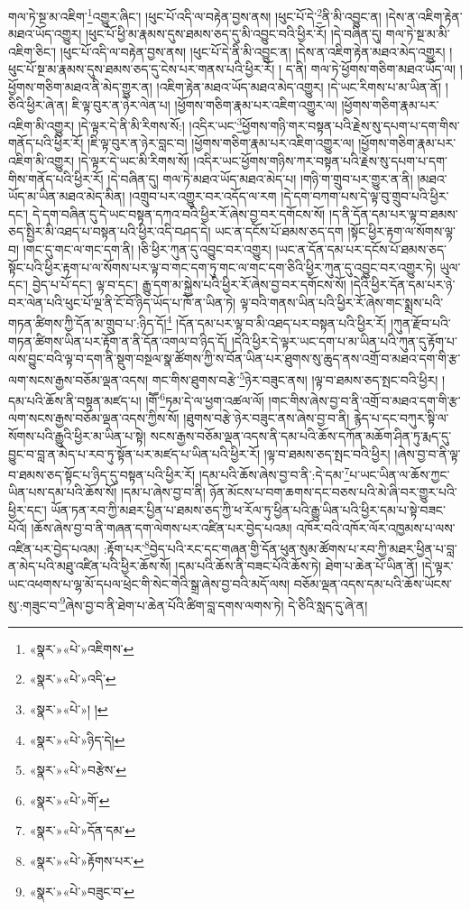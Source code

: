 གལ་ཏེ་སྔ་མ་འཇིག་\footnote{«སྣར་»«པེ་»འཇིགས་}འགྱུར་ཞིང་། །ཕུང་པོ་འདི་ལ་བརྟེན་བྱས་ནས། །ཕུང་པོ་དེ་\footnote{«སྣར་»«པེ་»འདི་}ནི་མི་འབྱུང་ན། །དེས་ན་འཇིག་རྟེན་མཐའ་ཡོད་འགྱུར། །ཕུང་པོ་ཕྱི་མ་རྣམས་དུས་ཐམས་ཅད་དུ་མི་འབྱུང་བའི་ཕྱིར་རོ། །དེ་བཞིན་དུ། གལ་ཏེ་སྔ་མ་མི་འཇིག་ཅིང་། །ཕུང་པོ་འདི་ལ་བརྟེན་བྱས་ནས། །ཕུང་པོ་དེ་ནི་མི་འབྱུང་ན། །དེས་ན་འཇིག་རྟེན་མཐའ་མེད་འགྱུར། །ཕུང་པོ་སྔ་མ་རྣམས་དུས་ཐམས་ཅད་དུ་ངེས་པར་གནས་པའི་ཕྱིར་རོ། །
ད་ནི། གལ་ཏེ་ཕྱོགས་གཅིག་མཐའ་ཡོད་ལ། །ཕྱོགས་གཅིག་མཐའ་ནི་མེད་གྱུར་ན། །འཇིག་རྟེན་མཐའ་ཡོད་མཐའ་མེད་འགྱུར། །དེ་ཡང་རིགས་པ་མ་ཡིན་ནོ། །ཅིའི་ཕྱིར་ཞེ་ན། ཇི་ལྟ་བུར་ན་ཉེར་ལེན་པ། །ཕྱོགས་གཅིག་རྣམ་པར་འཇིག་འགྱུར་ལ། །ཕྱོགས་གཅིག་རྣམ་པར་འཇིག་མི་འགྱུར། །དེ་ལྟར་དེ་ནི་མི་རིགས་སོ:། །འདིར་ཡང་\footnote{«སྣར་»«པེ་»། །}ཕྱོགས་གཉི་གར་བསྟན་པའི་རྗེས་སུ་དཔག་པ་དག་གིས་གནོད་པའི་ཕྱིར་རོ། །ཇི་ལྟ་བུར་ན་ཉེར་བླང་བ། །ཕྱོགས་གཅིག་རྣམ་པར་འཇིག་འགྱུར་ལ། །ཕྱོགས་གཅིག་རྣམ་པར་འཇིག་མི་འགྱུར། །དེ་ལྟར་དེ་ཡང་མི་རིགས་སོ། །འདིར་ཡང་ཕྱོགས་གཉིས་ཀར་བསྟན་པའི་རྗེས་སུ་དཔག་པ་དག་གིས་གནོད་པའི་ཕྱིར་རོ། །དེ་བཞིན་དུ། གལ་ཏེ་མཐའ་ཡོད་མཐའ་མེད་པ། །གཉི་ག་གྲུབ་པར་གྱུར་ན་ནི། །མཐའ་ཡོད་མ་ཡིན་མཐའ་མེད་མིན། །འགྲུབ་པར་འགྱུར་བར་འདོད་ལ་རག །དེ་དག་བཀག་པས་དེ་ལྟ་བུ་གྲུབ་པའི་ཕྱིར་དང་། དེ་དག་བཞིན་དུ་དེ་ཡང་བསྟན་དཀའ་བའི་ཕྱིར་རོ་ཞེས་བྱ་བར་དགོངས་སོ། །ད་ནི་དོན་དམ་པར་ལྟ་བ་ཐམས་ཅད་སྤྱིར་མི་འཐད་པ་བསྟན་པའི་ཕྱིར་འདི་བཤད་དེ། ཡང་ན་དངོས་པོ་ཐམས་ཅད་དག །སྟོང་ཕྱིར་རྟག་ལ་སོགས་ལྟ་བ། །གང་དུ་གང་ལ་གང་དག་ནི། །ཅི་ཕྱིར་ཀུན་དུ་འབྱུང་བར་འགྱུར། །ཡང་ན་དོན་དམ་པར་དངོས་པོ་ཐམས་ཅད་སྟོང་པའི་ཕྱིར་རྟག་པ་ལ་སོགས་པར་ལྟ་བ་གང་དག་ཏུ་གང་ལ་གང་དག་ཅིའི་ཕྱིར་ཀུན་དུ་འབྱུང་བར་འགྱུར་ཏེ། ཡུལ་དང་། བྱེད་པ་པོ་དང་། ལྟ་བ་དང་། རྒྱུ་དག་མ་སྐྱེས་པའི་ཕྱིར་རོ་ཞེས་བྱ་བར་དགོངས་སོ། །དེའི་ཕྱིར་དོན་དམ་པར་ཉེ་བར་ལེན་པའི་ཕུང་པོ་ལྔ་ནི་ངོ་བོ་ཉིད་ཡོད་པ་ཁོ་ན་ཡིན་ཏེ། ལྟ་བའི་གནས་ཡིན་པའི་ཕྱིར་རོ་ཞེས་གང་སྨྲས་པའི་གཏན་ཚིགས་ཀྱི་དོན་མ་གྲུབ་པ་:ཉིད་དོ།\footnote{«སྣར་»«པེ་»ཉིད་དེ།} །དོན་དམ་པར་ལྟ་བ་མི་འཐད་པར་བསྟན་པའི་ཕྱིར་རོ། །ཀུན་རྫོབ་པའི་གཏན་ཚིགས་ཡིན་པར་རྟོག་ན་ནི་དོན་འགལ་བ་ཉིད་དོ། །དེའི་ཕྱིར་དེ་ལྟར་ཡང་དག་པ་མ་ཡིན་པའི་ཀུན་དུ་རྟོག་པ་ལས་བྱུང་བའི་ལྟ་བ་དག་ནི་སྡུག་བསྔལ་སྣ་ཚོགས་ཀྱི་ས་བོན་ཡིན་པར་ཐུགས་སུ་ཆུད་ནས་འགྲོ་བ་མཐའ་དག་གི་རྩ་ལག་སངས་རྒྱས་བཅོམ་ལྡན་འདས། གང་གིས་ཐུགས་བརྩེ་\footnote{«སྣར་»«པེ་»བརྩེས་}ཉེར་བཟུང་ནས། །ལྟ་བ་ཐམས་ཅད་སྤང་བའི་ཕྱིར། །དམ་པའི་ཆོས་ནི་བསྟན་མཛད་པ། །གཽ་\footnote{«སྣར་»«པེ་»གོ་}ཏམ་དེ་ལ་ཕྱག་འཚལ་ལོ། །གང་གིས་ཞེས་བྱ་བ་ནི་འགྲོ་བ་མཐའ་དག་གི་རྩ་ལག་སངས་རྒྱས་བཅོམ་ལྡན་འདས་ཀྱིས་སོ། །ཐུགས་བརྩེ་ཉེར་བཟུང་ནས་ཞེས་བྱ་བ་ནི། རྙེད་པ་དང་བཀུར་སྟི་ལ་སོགས་པའི་རྒྱུའི་ཕྱིར་མ་ཡིན་པ་སྟེ། སངས་རྒྱས་བཅོམ་ལྡན་འདས་ནི་དམ་པའི་ཆོས་དཀོན་མཆོག་ཤིན་ཏུ་རྨད་དུ་བྱུང་བ་བླ་ན་མེད་པ་རབ་ཏུ་སྟོན་པར་མཛད་པ་ཡིན་པའི་ཕྱིར་རོ། །ལྟ་བ་ཐམས་ཅད་སྤང་བའི་ཕྱིར། །ཞེས་བྱ་བ་ནི་ལྟ་བ་ཐམས་ཅད་སྟོང་པ་ཉིད་དུ་བསྟན་པའི་ཕྱིར་རོ། །དམ་པའི་ཆོས་ཞེས་བྱ་བ་ནི་:དེ་དམ་\footnote{«སྣར་»«པེ་»དོན་དམ་}པ་ཡང་ཡིན་ལ་ཆོས་ཀྱང་ཡིན་པས་དམ་པའི་ཆོས་སོ། །དམ་པ་ཞེས་བྱ་བ་ནི། ཉོན་མོངས་པ་བག་ཆགས་དང་བཅས་པའི་མེ་ཞི་བར་གྱུར་པའི་ཕྱིར་དང་། ཡོན་ཏན་རབ་ཀྱི་མཐར་པྱིན་པ་ཐམས་ཅད་ཀྱི་ཕ་རོལ་ཏུ་ཕྱིན་པའི་རྒྱུ་ཡིན་པའི་ཕྱིར་དམ་པ་སྟེ་བཟང་པོའོ། །ཆོས་ཞེས་བྱ་བ་ནི་གཞན་དག་ལེགས་པར་འཛིན་པར་བྱེད་པའམ། འཁོར་བའི་འཁོར་ལོར་འཁྱམས་པ་ལས་འཛིན་པར་བྱེད་པའམ། :རྟོག་པར་\footnote{«སྣར་»«པེ་»རྟོགས་པར་}བྱེད་པའི་རང་དང་གཞན་གྱི་དོན་ཕུན་སུམ་ཚོགས་པ་རབ་ཀྱི་མཐར་ཕྱིན་པ་བླ་ན་མེད་པའི་མཐུ་འཛིན་པའི་ཕྱིར་ཆོས་སོ། །དམ་པའི་ཆོས་ནི་བཟང་པོའི་ཆོས་ཏེ། ཐེག་པ་ཆེན་པོ་ཡིན་ནོ། །དེ་ལྟར་ཡང་འཕགས་པ་ལྷ་མོ་དཔལ་ཕྲེང་གི་སེང་གེའི་སྒྲ་ཞེས་བྱ་བའི་མདོ་ལས། བཅོམ་ལྡན་འདས་དམ་པའི་ཆོས་ཡོངས་སུ་:གཟུང་བ་\footnote{«སྣར་»«པེ་»བཟུང་བ་}ཞེས་བྱ་བ་ནི་ཐེག་པ་ཆེན་པོའི་ཚིག་བླ་དགས་ལགས་ཏེ། དེ་ཅིའི་སླད་དུ་ཞེ་ན། 
